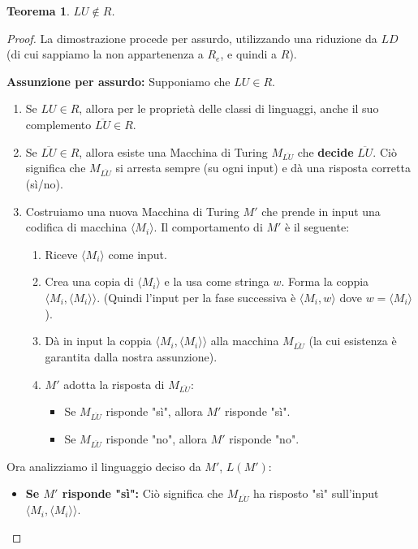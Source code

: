 \documentclass[a4paper, 11pt]{book} %
\newtheorem{theorem}{Teorema}[section]
\theoremstyle{definition}
\begin{document}
\begin{theorem}
$LU \notin R$.
\end{theorem}
\begin{proof}
La dimostrazione procede per assurdo, utilizzando una riduzione da $LD$ (di cui sappiamo la non appartenenza a $R_e$, e quindi a $R$).

\textbf{Assunzione per assurdo:} Supponiamo che $LU \in R$.
\begin{enumerate}
    \item Se $LU \in R$, allora per le proprietà delle classi di linguaggi, anche il suo complemento $\overline{LU} \in R$.
    \item Se $\overline{LU} \in R$, allora esiste una Macchina di Turing $M_{\overline{LU}}$ che \textbf{decide} $\overline{LU}$. Ciò significa che $M_{\overline{LU}}$ si arresta sempre (su ogni input) e dà una risposta corretta (sì/no).
    \item Costruiamo una nuova Macchina di Turing $M'$ che prende in input una codifica di macchina $\langle M_i \rangle$. Il comportamento di $M'$ è il seguente:
    \begin{enumerate}
        \item Riceve $\langle M_i \rangle$ come input.
        \item Crea una copia di $\langle M_i \rangle$ e la usa come stringa $w$. Forma la coppia $\langle M_i, \langle M_i \rangle \rangle$. (Quindi l'input per la fase successiva è $\langle M_i, w \rangle$ dove $w = \langle M_i \rangle$).
        \item Dà in input la coppia $\langle M_i, \langle M_i \rangle \rangle$ alla macchina $M_{\overline{LU}}$ (la cui esistenza è garantita dalla nostra assunzione).
        \item $M'$ adotta la risposta di $M_{\overline{LU}}$:
        \begin{itemize}
            \item Se $M_{\overline{LU}}$ risponde "sì", allora $M'$ risponde "sì".
            \item Se $M_{\overline{LU}}$ risponde "no", allora $M'$ risponde "no".
        \end{itemize}
    \end{enumerate}
\end{enumerate}
Ora analizziamo il linguaggio deciso da $M'$, $L(M')$:
\begin{itemize}
    \item \textbf{Se $M'$ risponde "sì":}
    Ciò significa che $M_{\overline{LU}}$ ha risposto "sì" sull'input $\langle M_i, \langle M_i \rangle \rangle$.

\end{itemize}
\end{proof}
\end{document}
